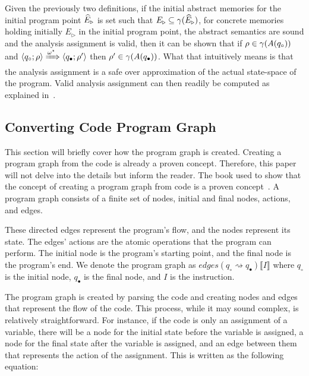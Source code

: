 Given the previously two definitions, if the initial abstract memories for the initial program point $\widehat{E}_\triangleright$ is set such that $E_{\triangleright} \subseteq \gamma(\widehat{E}_\triangleright)$, for concrete memories holding initially $E_{\triangleright}$ in the initial program point, the abstract semantics are sound and the analysis assignment is valid, then it can be shown that if $\rho \in \gamma(A(q_\circ))$ and $\langle q_\circ; \rho \rangle \xRightarrow{\omega^\star} \langle q_\bullet; \rho' \rangle$ then $\rho' \in \gamma(A(q_\bullet))$.
What that intuitively means is that the analysis assignment is a safe over approximation of the actual state-space of the program.
Valid analysis assignment can then readily be computed as explained in~\cite{nielson_formal_2019}.


\subsection{Converting Code Program Graph}\label{subsec:converting-code-program-graph}
This section will briefly cover how the program graph is created.
Creating a program graph from the code is already a proven concept.
Therefore, this paper will not delve into the details but inform the reader.
The book used to show that the concept of creating a program graph from code is a proven concept~\cite[see][chap 2.2]{nielson_formal_2019}.
A program graph consists of a finite set of nodes, initial and final nodes, actions, and edges.

These directed edges represent the program's flow, and the nodes represent its state.
The edges' actions are the atomic operations that the program can perform.
The initial node is the program's starting point, and the final node is the program's end.
We denote the program graph as $edges(q_{\circ} \rightsquigarrow q_{\bullet})\llbracket I \rrbracket$ where $q_{\circ}$ is the initial node, $q_{\bullet}$ is the final node, and $I$ is the instruction.

The program graph is created by parsing the code and creating nodes and edges that represent the flow of the code.
This process, while it may sound complex, is relatively straightforward.
For instance, if the code is only an assignment of a variable, there will be a node for the initial state before the variable is assigned, a node for the final state after the variable is assigned, and an edge between them that represents the action of the assignment.
This is written as the following equation:


